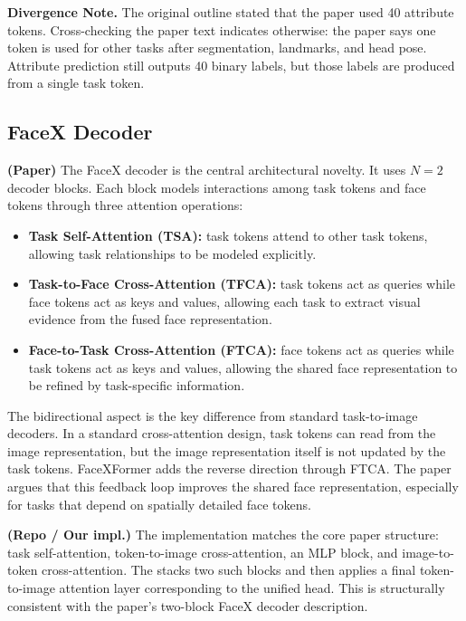 \documentclass[11pt]{article}
\begin{document}
\textbf{Divergence Note.} The original outline stated that the paper used 40 attribute tokens. Cross-checking the paper text indicates otherwise: the paper says one token is used for other tasks after segmentation, landmarks, and head pose. Attribute prediction still outputs 40 binary labels, but those labels are produced from a single task token.


\subsection{FaceX Decoder}


\textbf{(Paper)} The FaceX decoder is the central architectural novelty. It uses \(N=2\) decoder blocks. Each block models interactions among task tokens and face tokens through three attention operations:


\begin{itemize}[leftmargin=*]
\item \textbf{Task Self-Attention (TSA):} task tokens attend to other task tokens, allowing task relationships to be modeled explicitly.
\item \textbf{Task-to-Face Cross-Attention (TFCA):} task tokens act as queries while face tokens act as keys and values, allowing each task to extract visual evidence from the fused face representation.
\item \textbf{Face-to-Task Cross-Attention (FTCA):} face tokens act as queries while task tokens act as keys and values, allowing the shared face representation to be refined by task-specific information.
\end{itemize}

The bidirectional aspect is the key difference from standard task-to-image decoders. In a standard cross-attention design, task tokens can read from the image representation, but the image representation itself is not updated by the task tokens. FaceXFormer adds the reverse direction through FTCA. The paper argues that this feedback loop improves the shared face representation, especially for tasks that depend on spatially detailed face tokens.


\textbf{(Repo / Our impl.)} The  implementation matches the core paper structure: task self-attention, token-to-image cross-attention, an MLP block, and image-to-token cross-attention. The  stacks two such blocks and then applies a final token-to-image attention layer corresponding to the unified head. This is structurally consistent with the paper's two-block FaceX decoder description.
\end{document}
